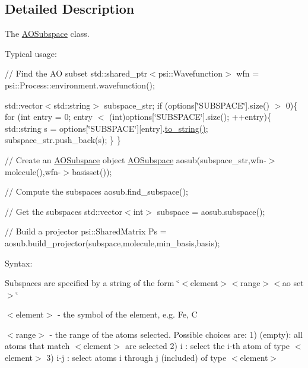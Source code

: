 \subsection{Detailed Description}
The \mbox{\hyperlink{classforte_1_1_a_o_subspace}{A\+O\+Subspace}} class. 

Typical usage\+:

// Find the AO subset std\+::shared\+\_\+ptr$<$psi\+::\+Wavefunction$>$ wfn = psi\+::\+Process\+::environment.\+wavefunction();

std\+::vector$<$std\+::string$>$ subspace\+\_\+str; if (options\mbox{[}\char`\"{}\+S\+U\+B\+S\+P\+A\+C\+E\char`\"{}\mbox{]}.size() $>$ 0)\{ for (int entry = 0; entry $<$ (int)options\mbox{[}\char`\"{}\+S\+U\+B\+S\+P\+A\+C\+E\char`\"{}\mbox{]}.size(); ++entry)\{ std\+::string s = options\mbox{[}\char`\"{}\+S\+U\+B\+S\+P\+A\+C\+E\char`\"{}\mbox{]}\mbox{[}entry\mbox{]}.\mbox{\hyperlink{namespaceforte_ad34ed14298b7916ff1817d24c6e33cf1}{to\+\_\+string()}}; subspace\+\_\+str.\+push\+\_\+back(s); \} \}

// Create an \mbox{\hyperlink{classforte_1_1_a_o_subspace}{A\+O\+Subspace}} object \mbox{\hyperlink{classforte_1_1_a_o_subspace}{A\+O\+Subspace}} aosub(subspace\+\_\+str,wfn-\/$>$molecule(),wfn-\/$>$basisset());

// Compute the subspaces aosub.\+find\+\_\+subspace();

// Get the subspaces std\+::vector$<$int$>$ subspace = aosub.\+subspace();

// Build a projector psi\+::\+Shared\+Matrix Ps = aosub.\+build\+\_\+projector(subspace,molecule,min\+\_\+basis,basis);

Syntax\+:

Subspaces are specified by a string of the form \char`\"{}$<$element$>$$<$range$>$$<$ao set$>$\char`\"{}

$<$element$>$ -\/ the symbol of the element, e.\+g. \textquotesingle{}Fe\textquotesingle{}, \textquotesingle{}C\textquotesingle{}

$<$range$>$ -\/ the range of the atoms selected. Possible choices are\+: 1) \textquotesingle{}\textquotesingle{} (empty)\+: all atoms that match $<$element$>$ are selected 2) \textquotesingle{}i\textquotesingle{} \+: select the i-\/th atom of type $<$element$>$ 3) \textquotesingle{}i-\/j\textquotesingle{} \+: select atoms i through j (included) of type $<$element$>$


